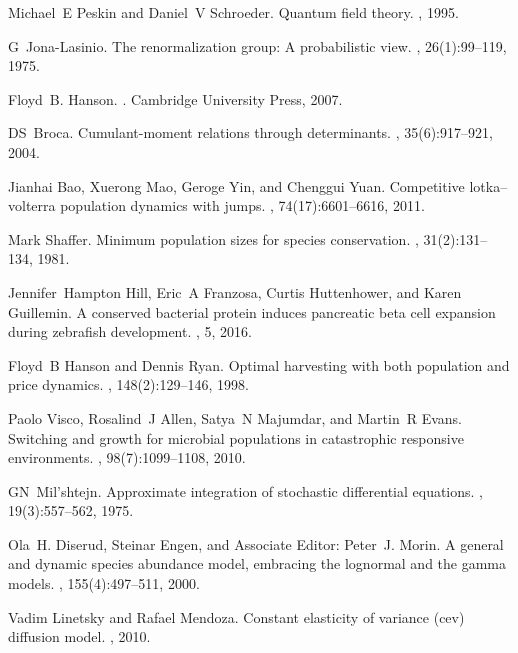 \begin{thebibliography}{10}
	Michael~E Peskin and Daniel~V Schroeder.
	\newblock Quantum field theory.
	, 1995.
	
	G~Jona-Lasinio.
	\newblock The renormalization group: A probabilistic view.
	, 26(1):99--119, 1975.
	
	Floyd~B. Hanson.
	.
	\newblock Cambridge University Press, 2007.
	
	DS~Broca.
	\newblock Cumulant-moment relations through determinants.
	, 35(6):917--921, 2004.
	
	Jianhai Bao, Xuerong Mao, Geroge Yin, and Chenggui Yuan.
	\newblock Competitive lotka--volterra population dynamics with jumps.
	,
	74(17):6601--6616, 2011.
	
	Mark Shaffer.
	\newblock Minimum population sizes for species conservation.
	, 31(2):131--134, 1981.
	
	Jennifer~Hampton Hill, Eric~A Franzosa, Curtis Huttenhower, and Karen
	Guillemin.
	\newblock A conserved bacterial protein induces pancreatic beta cell expansion
	during zebrafish development.
	, 5, 2016.
	
	Floyd~B Hanson and Dennis Ryan.
	\newblock Optimal harvesting with both population and price dynamics.
	, 148(2):129--146, 1998.
	
	Paolo Visco, Rosalind~J Allen, Satya~N Majumdar, and Martin~R Evans.
	\newblock Switching and growth for microbial populations in catastrophic
	responsive environments.
	, 98(7):1099--1108, 2010.
	
	GN~Mil'shtejn.
	\newblock Approximate integration of stochastic differential equations.
	, 19(3):557--562,
	1975.
	
	Ola~H. Diserud, Steinar Engen, and Associate Editor: Peter~J. Morin.
	\newblock A general and dynamic species abundance model, embracing the
	lognormal and the gamma models.
	, 155(4):497--511, 2000.
	
	Vadim Linetsky and Rafael Mendoza.
	\newblock Constant elasticity of variance (cev) diffusion model.
	, 2010.
	
\end{thebibliography}

